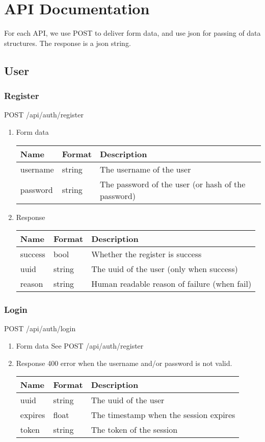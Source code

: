 \documentclass[11pt]{article}
\author{Jimmy Z}
\date{\today}
\title{}
\begin{document}
\tableofcontents

\section{API Documentation}
\label{sec:orgf1d93eb}
For each API, we use POST to deliver form data, and use json for passing of
data structures. The response is a json string.
\subsection{User}
\label{sec:org3a1d720}
\subsubsection{Register}
\label{sec:orgbf32299}
POST /api/auth/register
\begin{enumerate}
\item Form data
\label{sec:org8852a24}
\begin{center}
\begin{tabular}{lll}
Name & Format & Description\\
\hline
username & string & The username of the user\\
password & string & The password of the user (or hash of the password)\\
\end{tabular}
\end{center}
\item Response
\label{sec:org123a97a}
\begin{center}
\begin{tabular}{lll}
Name & Format & Description\\
\hline
success & bool & Whether the register is success\\
uuid & string & The uuid of the user (only when success)\\
reason & string & Human readable reason of failure (when fail)\\
\end{tabular}
\end{center}
\end{enumerate}
\subsubsection{Login}
\label{sec:org477a42b}
POST /api/auth/login
\begin{enumerate}
\item Form data
\label{sec:org62ed299}
See POST /api/auth/register
\item Response
\label{sec:org5c2d377}
400 error when the username and/or password is not valid.
\begin{center}
\begin{tabular}{lll}
Name & Format & Description\\
\hline
uuid & string & The uuid of the user\\
expires & float & The timestamp when the session expires\\
token & string & The token of the session\\
\end{tabular}
\end{center}
\end{enumerate}
\end{document}

